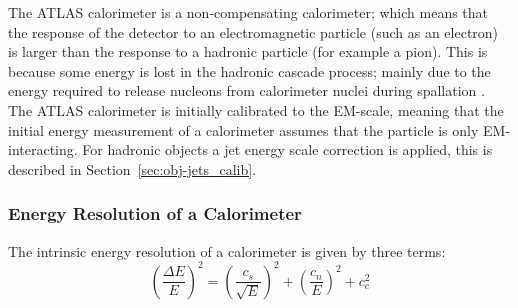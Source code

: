 
The ATLAS calorimeter is a non-compensating calorimeter;
which means that the response of the detector to an electromagnetic particle (such as an electron)
is larger than the response to a hadronic particle (for example a pion).
This is because some energy is lost in the hadronic cascade process;
mainly due to the energy required to release nucleons from calorimeter nuclei during spallation \cite{det-comp_calo, det-thesis_lene}.
The ATLAS calorimeter is initially calibrated to the EM-scale,
meaning that the initial energy measurement of a calorimeter assumes that the particle is only EM-interacting.
For hadronic objects a jet energy scale correction is applied,
this is described in Section~\ref{sec:obj-jets_calib}.

\subsubsection{Energy Resolution of a Calorimeter}
\label{sec:det-calo_noise}

The intrinsic energy resolution of a calorimeter is given by three terms:
\begin{equation}
  \left(\frac{\Delta E}{E}\right)^2 = \left(\frac{c_s}{\sqrt{E}}\right)^2 + \left(\frac{c_n}{E}\right)^2 + c_c^2
\end{equation}

